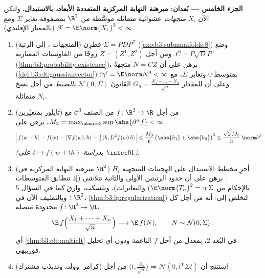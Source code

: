 \begin{problem}
\medskip
\noindent\textbf{الجزء الخامس --- بُعدان: مبرهنة النهاية
المركزية المتعددة الأبعاد، بالاستبدال.} ولتكن الآن $X_i$
\emph{متجهات} عشوائية  متماثلة موسَّطة من $\R^2$ بمصفوفة
تغاير $\Sigma$ ومع $\beta' = \E\norm{X_1}^3 <
\infty$ (بالمعيار الإقليدي).
\begin{enumerate}[resume]
  \item (المتجهات ، إلى الرتبة) قطرِن $\Sigma =
        PDP^{\mathsf T}$
        (\cref{exo:b3:submanifolds:8}) وضع $C = P\sqrt DP^{\mathsf T}$. ومن أجل $Z = (Z^1,
        Z^2)$ زوجًا من
        الغاوسيات المعيارية  (\cref{thm:b3:probability:existence})، برهن على
        أن $N
        = CZ$ متجهةٌ  (\cref{def:b3:clt:gaussianvector}) بمتوسط $0$
        وتغاير $\Sigma$، مع $\gamma' = \E\norm N^3 <
        \infty$؛ وعلى أن للمقدار $G_n = \frac{N_1 + \dots +
        N_n}{\sqrt n}$
        القانونَ $\mathcal N(0, \Sigma)$ \emph{بالضبط} من أجل نسخ 
        متماثلة $N_i$.
  \item (تايلور بمتغيّرين) من أجل $f \colon \R^2 \to
        \R$ من الصنف
        $\mathcal C^3$ مع $M_3 =
        \max_{\abs\alpha = 3}\sup\abs{\partial^\alpha f} <
        \infty$، برهن على
        \[
        \Bigl|f(w + h) - f(w) - \langle\nabla f(w),
        h\rangle - \tfrac12\langle h, D^2f(w)\,h\rangle
        \Bigr| \leq \frac{M_3}6\,\bigl(\abs{h_1} +
        \abs{h_2}\bigr)^3 \leq \frac{\sqrt2\,M_3}3\,
        \norm h^3
        \]
        \emph{(بدراسة $t \mapsto f(w + th)$ على $\intcc01$)}.
  \item (مبرهنة النهاية المركزية في $\R^2$) أجرِ مخطط
        الاستبدال على الهجينات المتجهية $H_i$: برهن على أن
        حدود الرتبتين الأولى والثانية تتلاشى (إذ تتطابق
        المتوسطات والتغايرات)، وتلسكب، وارقَ كما في السؤال 5
        (بالإحكام من $\E\norm{T_n}^2 =
        \operatorname{tr}\Sigma$؛ وبالتمليف الآن في $\R^2$،
        \cref{thm:b3:lp:regularization}) لتخلص إلى: أنه من أجل كل $f \colon
        \R^2 \to \R$ محدودة
        متصلة،
        \[
        \E\,f\Bigl(\frac{X_1 + \dots + X_n}{\sqrt n}\Bigr)
        \longrightarrow \E\,f(N), \qquad N \sim \mathcal
        N(0, \Sigma) :
        \]
        أي \cref{thm:b3:clt:multiclt} في البُعد $2$، بمعدل من أجل $f$ الناعمة
        ودون أي تحليل فورييهي.
  \item (كرامر--وولد، وتذبذب مشترك) استنتج أن $\langle t, \frac{S_n}{\sqrt n}\rangle
        \Rightarrow \mathcal N(0, t^{\mathsf T}\Sigma t)$ من أجل

\end{enumerate}
\end{problem}
